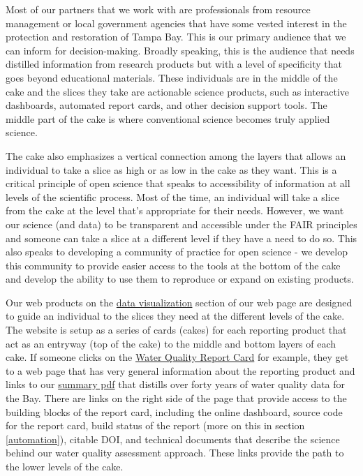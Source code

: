 \documentclass[
]{book}
\begin{document}
Most of our partners that we work with are professionals from resource management or local government agencies that have some vested interest in the protection and restoration of Tampa Bay. This is our primary audience that we can inform for decision-making. Broadly speaking, this is the audience that needs distilled information from research products but with a level of specificity that goes beyond educational materials. These individuals are in the middle of the cake and the slices they take are actionable science products, such as interactive dashboards, automated report cards, and other decision support tools. The middle part of the cake is where conventional science becomes truly applied science.

The cake also emphasizes a vertical connection among the layers that allows an individual to take a slice as high or as low in the cake as they want. This is a critical principle of open science that speaks to accessibility of information at all levels of the scientific process. Most of the time, an individual will take a slice from the cake at the level that's appropriate for their needs. However, we want our science (and data) to be transparent and accessible under the FAIR principles and someone can take a slice at a different level if they have a need to do so. This also speaks to developing a community of practice for open science - we develop this community to provide easier access to the tools at the bottom of the cake and develop the ability to use them to reproduce or expand on existing products.

Our web products on the \href{https://tbep.org/our-work/data-vizualization/}{data visualization} section of our web page are designed to guide an individual to the slices they need at the different levels of the cake. The website is setup as a series of cards (cakes) for each reporting product that act as an entryway (top of the cake) to the middle and bottom layers of each cake. If someone clicks on the \href{https://tbep.org/water-quality-report-card/}{Water Quality Report Card} for example, they get to a web page that has very general information about the reporting product and links to our \href{https://drive.google.com/file/d/124FXmLcXKYUf3ktaVOvFejndiPS0m7K7/view?usp=sharing}{summary pdf} that distills over forty years of water quality data for the Bay. There are links on the right side of the page that provide access to the building blocks of the report card, including the online dashboard, source code for the report card, build status of the report (more on this in section \ref{automation}), citable DOI, and technical documents that describe the science behind our water quality assessment approach. These links provide the path to the lower levels of the cake.
\end{document}
